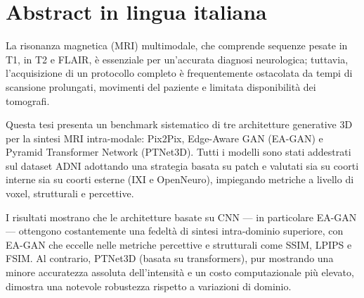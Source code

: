 \documentclass[11pt,a4paper]{article}
\begin{document}




\cleardoublepage

\section*{Abstract in lingua italiana}
La risonanza magnetica (MRI) multimodale, che comprende sequenze pesate in T1, in T2 e FLAIR, è essenziale per un'accurata diagnosi neurologica; tuttavia, l'acquisizione di un protocollo completo è frequentemente ostacolata da tempi di scansione prolungati, movimenti del paziente e limitata disponibilità dei tomografi.

Questa tesi presenta un benchmark sistematico di tre architetture generative 3D per la sintesi MRI intra-modale: Pix2Pix, Edge-Aware GAN (EA-GAN) e Pyramid Transformer Network (PTNet3D). Tutti i modelli sono stati addestrati sul dataset ADNI adottando una strategia basata su patch e valutati sia su coorti interne sia su coorti esterne (IXI e OpenNeuro), impiegando metriche a livello di voxel, strutturali e percettive.

I risultati mostrano che le architetture basate su CNN — in particolare EA-GAN — ottengono costantemente una fedeltà di sintesi intra-dominio superiore, con EA-GAN che eccelle nelle metriche percettive e strutturali come SSIM, LPIPS e FSIM. Al contrario, PTNet3D (basata su transformers), pur mostrando una minore accuratezza assoluta dell'intensità e un costo computazionale più elevato, dimostra una notevole robustezza rispetto a variazioni di dominio.
\end{document}
